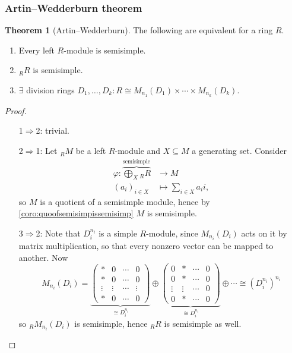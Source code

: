 \documentclass[a4paper]{article}
\theoremstyle{definition}
\newtheorem{thm}[defn]{Theorem}
\begin{document}
\subsubsection{Artin–Wedderburn theorem}
\begin{thm}[Artin–Wedderburn]
\label{thm:artinWedderburn}
The following are equivalent for a ring $R$.
\begin{enumerate}
\item Every left $R$-module is semisimple.
\item $_R R$ is semisimple.
\item $\exists$ division rings $D_1,\ldots,D_k:R\cong M_{n_1}(D_1)\times\cdots\times M_{n_k}(D_k)$.
\end{enumerate}
\end{thm}
\begin{proof}
\begin{itemize}
\item[1$\Rightarrow$2:] trivial.
\item[2$\Rightarrow$1:] Let $_RM$ be a left $R$-module and $X\subseteq M$ a generating set. Consider
\[
\begin{aligned}
\varphi:\overbrace{\bigoplus_X{}_RR}^{\text{semisimple}} &\rightarrow M\\
(a_i)_{i\in X}&\mapsto \sum_{i\in X}a_i i,
\end{aligned}
\]
so $M$ is a quotient of a semisimple module, hence by \ref{coro:quoofsemisimpissemisimp} $M$ is semisimple.
\item[3$\Rightarrow$2:] Note that $D_i^{n_i}$ is a simple $R$-module, since $M_{n_i}(D_i)$ acts on it by matrix multiplication, so that every nonzero vector can be mapped to another. Now
\[
M_{n_i}(D_i)=\underbrace{\begin{pmatrix}
\ast & 0 & \cdots & 0 \\
\ast & 0 & \cdots & 0\\
\vdots & \vdots & \cdots & \vdots\\
\ast & 0 & \cdots & 0
\end{pmatrix}}_{\cong D_i^{n_i}}\oplus\underbrace{\begin{pmatrix}
0 & \ast & \cdots & 0 \\
0 & \ast & \cdots & 0\\
\vdots & \vdots & \cdots & 0\\
0 & \ast & \cdots & 0
\end{pmatrix}}_{\cong D_i^{n_i}}\oplus\cdots\cong \left(D_i^{n_i}\right)^{n_i}
\]
so $_RM_{n_i}(D_i)$ is semisimple, hence $_RR$ is semisimple as well.

\end{itemize}
\end{proof}
\end{document}
